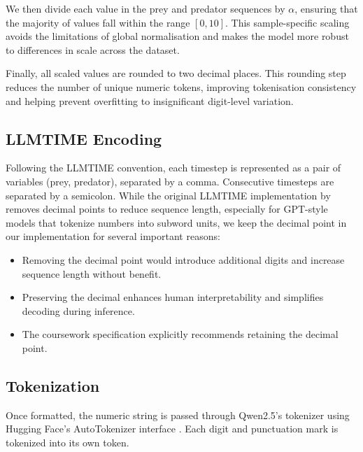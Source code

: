 \documentclass[a4paper,12pt]{article}
\begin{document}
We then divide each value in the prey and predator sequences by $\alpha$, ensuring that the majority of values fall within the range $[0, 10]$. This sample-specific scaling avoids the limitations of global normalisation and makes the model more robust to differences in scale across the dataset.

Finally, all scaled values are rounded to two decimal places. This rounding step reduces the number of unique numeric tokens, improving tokenisation consistency and helping prevent overfitting to insignificant digit-level variation.


\subsection*{LLMTIME Encoding}

Following the LLMTIME convention, each timestep is represented as a pair of variables (prey, predator), separated by a comma. Consecutive timesteps are separated by a semicolon. While the original LLMTIME implementation by \citet{gruver2023language} removes decimal points to reduce sequence length, especially for GPT-style models that tokenize numbers into subword units, we keep the decimal point in our implementation for several important reasons:

\begin{itemize}
  \item Removing the decimal point would introduce additional digits and increase sequence length without benefit.
  \item Preserving the decimal enhances human interpretability and simplifies decoding during inference.
  \item The coursework specification explicitly recommends retaining the decimal point.
\end{itemize}

\subsection*{Tokenization}

Once formatted, the numeric string is passed through Qwen2.5’s tokenizer using Hugging Face’s AutoTokenizer interface \cite{huggingface}. Each digit and punctuation mark is tokenized into its own token.
\end{document}
